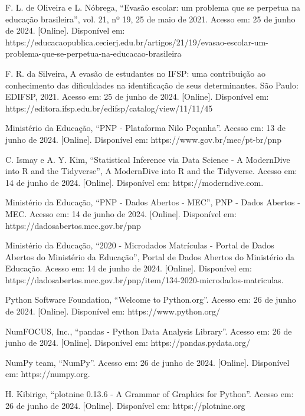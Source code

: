 \documentclass[conference]{IEEEtran}
\begin{document}
\begin{thebibliography}{1}

 F. L. de Oliveira e L. Nóbrega, “Evasão escolar: um problema que se perpetua na educação brasileira”, vol. 21, nº 19, 25 de maio de 2021. Acesso em: 25 de junho de 2024. [Online]. Disponível em: https://educacaopublica.cecierj.edu.br/artigos/21/19/evasao-escolar-um-problema-que-se-perpetua-na-educacao-brasileira

 F. R. da Silveira, A  evasão  de  estudantes  no  IFSP:  uma  contribuição  ao  conhecimento  das  dificuldades  na  identificação  de  seus determinantes. São Paulo: EDIFSP, 2021. Acesso em: 25 de junho de 2024. [Online]. Disponível em: https://editora.ifsp.edu.br/edifsp/catalog/view/11/11/45

 Ministério da Educação, “PNP - Plataforma Nilo Peçanha”. Acesso em: 13 de junho de 2024. [Online]. Disponível em: https://www.gov.br/mec/pt-br/pnp

 C. Ismay e A. Y. Kim, “Statistical Inference via Data Science - A ModernDive into R and the Tidyverse”, A ModernDive into R and the Tidyverse. Acesso em: 14 de junho de 2024. [Online]. Disponível em: https://moderndive.com.

 Ministério da Educação, “PNP - Dados Abertos - MEC”, PNP - Dados Abertos - MEC. Acesso em: 14 de junho de 2024. [Online]. Disponível em: https://dadosabertos.mec.gov.br/pnp

 Ministério da Educação, “2020 - Microdados Matrículas - Portal de Dados Abertos do Ministério da Educação”, Portal de Dados Abertos do Ministério da Educação. Acesso em: 14 de junho de 2024. [Online]. Disponível em: https://dadosabertos.mec.gov.br/pnp/item/134-2020-microdados-matriculas.

 Python Software Foundation, “Welcome to Python.org”. Acesso em: 26 de junho de 2024. [Online]. Disponível em: https://www.python.org/

 NumFOCUS, Inc., “pandas - Python Data Analysis Library”. Acesso em: 26 de junho de 2024. [Online]. Disponível em: https://pandas.pydata.org/

 NumPy team, “NumPy”. Acesso em: 26 de junho de 2024. [Online]. Disponível em: https://numpy.org.

 H. Kibirige, “plotnine 0.13.6 - A Grammar of Graphics for Python”. Acesso em: 26 de junho de 2024. [Online]. Disponível em: https://plotnine.org


\end{thebibliography}
\end{document}
